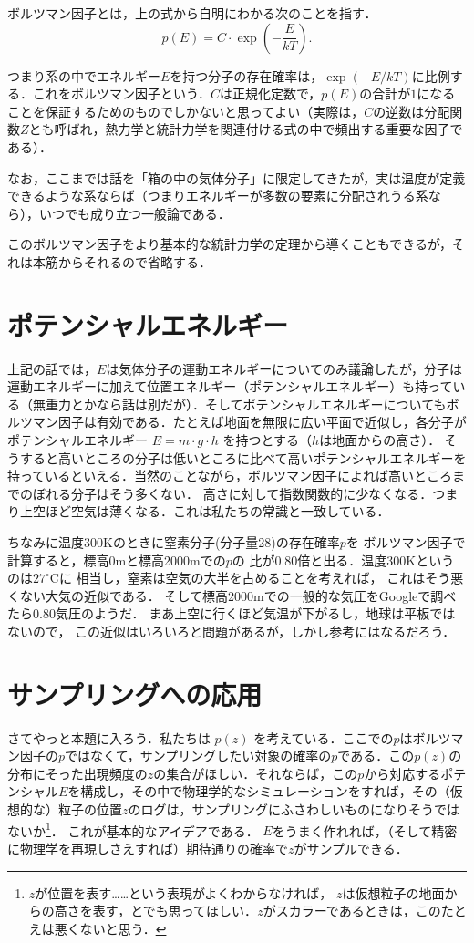 ボルツマン因子とは，上の式から自明にわかる次のことを指す．
%
$$p(E) = C \cdot \exp{ \left( - \frac{E}{k T} \right)}.$$

つまり系の中でエネルギー$E$を持つ分子の存在確率は，$\exp(-E/kT)$に比例する．これをボルツマン因子という．$C$は正規化定数で，$p(E)$の合計が$1$になることを保証するためのものでしかないと思ってよい（実際は，$C$の逆数は分配関数$Z$とも呼ばれ，熱力学と統計力学を関連付ける式の中で頻出する重要な因子である）．

なお，ここまでは話を「箱の中の気体分子」に限定してきたが，実は温度が定義できるような系ならば（つまりエネルギーが多数の要素に分配されうる系なら），いつでも成り立つ一般論である．

このボルツマン因子をより基本的な統計力学の定理から導くこともできるが，それは本筋からそれるので省略する．

\section{ポテンシャルエネルギー}

上記の話では，$E$は気体分子の運動エネルギーについてのみ議論したが，分子は運動エネルギーに加えて位置エネルギー（ポテンシャルエネルギー）も持っている（無重力とかなら話は別だが）．そしてポテンシャルエネルギーについてもボルツマン因子は有効である．たとえば地面を無限に広い平面で近似し，各分子がポテンシャルエネルギー $E = m \cdot g \cdot h$ を持つとする（$h$は地面からの高さ）．
そうすると高いところの分子は低いところに比べて高いポテンシャルエネルギーを持っているといえる．当然のことながら，ボルツマン因子によれば高いところまでのぼれる分子はそう多くない．
\pagebreak
高さに対して指数関数的に少なくなる．つまり上空ほど空気は薄くなる．これは私たちの常識と一致している．

ちなみに温度300\xu{}Kのときに窒素分子(分子量28)の存在確率$p$を
ボルツマン因子で計算すると，標高0\xu{}mと標高2000\xu{}mでの$p$の
比が0.80倍と出る．温度300\xu{}Kというのは$27^\circ\text{C}$に
相当し，窒素は空気の大半を占めることを考えれば，
これはそう悪くない大気の近似である．
そして標高2000\xu{}mでの一般的な気圧をGoogleで調べたら0.80気圧のようだ．
まあ上空に行くほど気温が下がるし，地球は平板ではないので，
この近似はいろいろと問題があるが，しかし参考にはなるだろう．

\section{サンプリングへの応用}

  さてやっと本題に入ろう．私たちは $p(z)$ を考えている．ここでの$p$はボルツマン因子の$p$ではなくて，サンプリングしたい対象の確率の$p$である．この$p(z)$の分布にそった出現頻度の$z$の集合がほしい．それならば，この$p$から対応するポテンシャル$E$を構成し，その中で物理学的なシミュレーションをすれば，その（仮想的な）粒子の位置$z$のログは，サンプリングにふさわしいものになりそうではないか\footnote{$z$が位置を表す……という表現がよくわからなければ，
$z$は仮想粒子の地面からの高さを表す，とでも思ってほしい．$z$がスカラーであるときは，このたとえは悪くないと思う．}．
これが基本的なアイデアである．
$E$をうまく作れれば，（そして精密に物理学を再現しさえすれば）期待通りの確率で$z$がサンプルできる．

